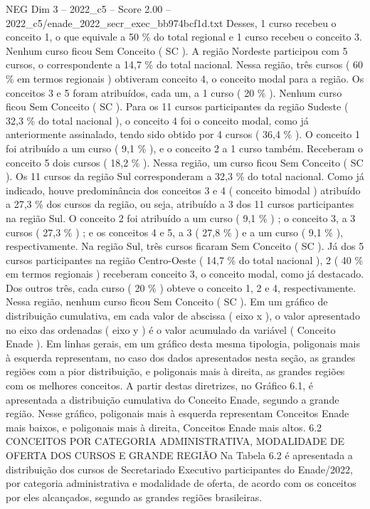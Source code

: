 \begin{textsample}{NEG Dim 3 – 2022\_c5 – Score 2.00 – 2022\_c5/enade\_2022\_secr\_exec\_bb974bcf1d.txt}
Desses, 1 curso recebeu o conceito 1, o que equivale a 50 \% do total regional e 1 curso recebeu o conceito 3.
Nenhum curso ficou Sem Conceito ( SC ).
A região Nordeste participou com 5 cursos, o correspondente a 14,7 \% do total nacional.
Nessa região, três cursos ( 60 \% em termos regionais ) obtiveram conceito 4, o conceito modal para a região.
Os conceitos 3 e 5 foram atribuídos, cada um, a 1 curso ( 20 \% ).
Nenhum curso ficou Sem Conceito ( SC ).
Para os 11 cursos participantes da região Sudeste ( 32,3 \% do total nacional ), o conceito 4 foi o conceito modal, como já anteriormente assinalado, tendo sido obtido por 4 cursos ( 36,4 \% ).
O conceito 1 foi atribuído a um curso ( 9,1 \% ), e o conceito 2 a 1 curso também.
Receberam o conceito 5 dois cursos ( 18,2 \% ).
Nessa região, um curso ficou Sem Conceito ( SC ).
Os 11 cursos da região Sul corresponderam a 32,3 \% do total nacional.
Como já indicado, houve predominância dos conceitos 3 e 4 ( conceito bimodal ) atribuído a 27,3 \% dos cursos da região, ou seja, atribuído a 3 dos 11 cursos participantes na região Sul.
O conceito 2 foi atribuído a um curso ( 9,1 \% ) ; o conceito 3, a 3 cursos ( 27,3 \% ) ; e os conceitos 4 e 5, a 3 ( 27,8 \% ) e a um curso ( 9,1 \% ), respectivamente.
Na região Sul, três cursos ficaram Sem Conceito ( SC ).
Já dos 5 cursos participantes na região Centro-Oeste ( 14,7 \% do total nacional ), 2 ( 40 \% em termos regionais ) receberam conceito 3, o conceito modal, como já destacado.
Dos outros três, cada curso ( 20 \% ) obteve o conceito 1, 2 e 4, respectivamente.
Nessa região, nenhum curso ficou Sem Conceito ( SC ).
Em um gráfico de distribuição cumulativa, em cada valor de abscissa ( eixo x ), o valor apresentado no eixo das ordenadas ( eixo y ) é o valor acumulado da variável ( Conceito Enade ).
Em linhas gerais, em um gráfico desta mesma tipologia, poligonais mais à esquerda representam, no caso dos dados apresentados nesta seção, as grandes regiões com a pior distribuição, e poligonais mais à direita, as grandes regiões com os melhores conceitos.
A partir destas diretrizes, no Gráfico 6.1, é apresentada a distribuição cumulativa do Conceito Enade, segundo a grande região.
Nesse gráfico, poligonais mais à esquerda representam Conceitos Enade mais baixos, e poligonais mais à direita, Conceitos Enade mais altos. 6.2 CONCEITOS POR CATEGORIA ADMINISTRATIVA, MODALIDADE DE OFERTA DOS CURSOS E GRANDE REGIÃO Na Tabela 6.2 é apresentada a distribuição dos cursos de Secretariado Executivo participantes do Enade/2022, por categoria administrativa e modalidade de oferta, de acordo com os conceitos por eles alcançados, segundo as grandes regiões brasileiras.

\end{textsample}
